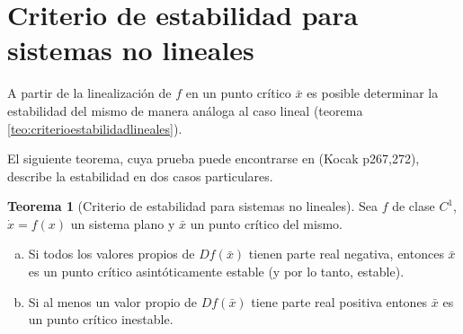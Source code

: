 \documentclass[11pt]{book}
\theoremstyle{definition}
\numberwithin{definition}{section}
\theoremstyle{theorem}
\newtheorem{theorem}{Teorema}
\numberwithin{theorem}{section}
\numberwithin{lemma}{section}
\numberwithin{corollary}{section}
\theoremstyle{plain}
\numberwithin{example}{section}
\begin{document}
\section{Criterio de estabilidad para sistemas no lineales}
A partir de la linealización de $f$ en un punto crítico $\bar{x}$ es posible determinar la estabilidad del mismo de manera análoga al caso lineal (teorema \ref{teo:criterioestabilidadlineales}).

El siguiente teorema, cuya prueba puede encontrarse en (Kocak p267,272), describe la estabilidad en dos casos particulares.

\begin{theorem}[Criterio de estabilidad para sistemas no lineales] \label{teo:criterioestabilidadnolineales}
Sea $f$ de clase $C^1$, $\dot{x} = f(x)$ un sistema plano y $\bar{x}$ un punto crítico del mismo.

\begin{enumerate}[(a)]
	\item Si todos los valores propios de $Df(\bar{x})$ tienen parte real negativa, entonces $\bar{x}$ es un punto crítico asintóticamente estable (y por lo tanto, estable).
	\item Si al menos un valor propio de $Df(\bar{x})$ tiene parte real positiva entones $\bar{x}$ es un punto crítico inestable.
\end{enumerate}
\end{theorem}
\end{document}
